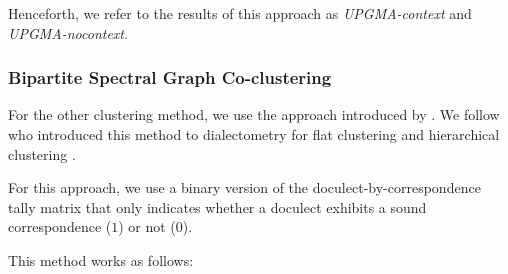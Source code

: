 \documentclass[a4paper]{article}
\begin{document}
Henceforth, we refer to the results of this approach
as \textit{UPGMA-context} and \textit{UPGMA-nocontext}.

\subsubsection{Bipartite Spectral Graph Co-clustering}
\label{subsubsec:bsgc}

For the other clustering method, we use the approach
introduced by \citet{dhillon2001co-clustering}.
We follow \citeauthor*{wieling2009bipartite} who introduced
this method to dialectometry for flat clustering \citeyearpar{wieling2009bipartite} and hierarchical clustering \citeyearpar{wieling2010hierarchical}.

For this approach, we use a binary version of the
doculect-by-correspondence tally matrix that only
indicates whether a doculect exhibits
a sound correspondence ($1$) or not ($0$).

This method works as follows:
\end{document}

